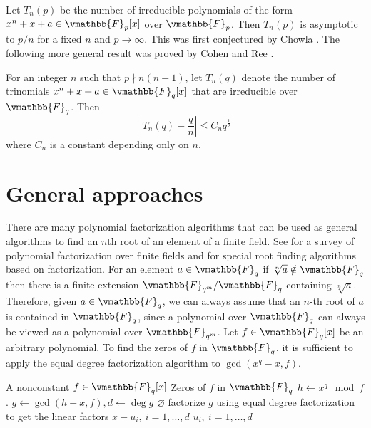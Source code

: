 Let $T_n(p)$ be the number of irreducible polynomials of the form $x^n + x + a \in \vmathbb{F}_p[x]$ 
over $\vmathbb{F}_p$. Then $T_n(p)$ is asymptotic to $p / n$ for a fixed $n$ and $p \rightarrow 
\infty$. This was first conjectured by Chowla \cite{Chowla1966}. The following more general result 
was proved by Cohen \cite{Cohen1970} and Ree \cite{Ree1971}. 
\begin{theorem}
For an integer $n$ such that $p \nmid n(n - 1)$, let $T_n(q)$ denote the number of trinomials $x^n + 
x + a \in \vmathbb{F}_q[x]$ that are irreducible over $\vmathbb{F}_q$. Then
$$
\left| T_n(q) - \frac{q}{n} \right| \le C_nq^{\frac{1}{2}}
$$
where $C_n$ is a constant depending only on $n$.
\end{theorem}









\section{General approaches}

There are many polynomial factorization algorithms that can be used as general algorithms to find an 
$n$th root of an element of a finite field. See \cite{vonzurGathen2001} for a survey of polynomial 
factorization over finite fields and \cite{Lidl-Niederreiter1994} for special root finding 
algorithms based on factorization. For an element $a \in \vmathbb{F}_q$ if $\sqrt[n]{a} \notin 
\vmathbb{F}_q$ then there is a finite extension $\vmathbb{F}_{q^m} / \vmathbb{F}_q$ containing 
$\sqrt[n]{a}$. Therefore, given $a \in \vmathbb{F}_q$, we can always assume that an $n$-th root of 
$a$ is contained in $\vmathbb{F}_q$, since a polynomial over $\vmathbb{F}_q$ can always be viewed as a 
polynomial over $\vmathbb{F}_{q^m}$. Let $f \in \vmathbb{F}_q[x]$ be an arbitrary polynomial. To find 
the zeros of $f$ in $\vmathbb{F}_q$, it is sufficient to apply the equal degree factorization 
algorithm to $\gcd(x^q - x, f)$.

\begin{algorithm}
\label{algorithm:groot1}
\begin{algorithmic}[1]
\REQUIRE A nonconstant $f \in \vmathbb{F}_q[x]$
\ENSURE  Zeros of $f$ in $\vmathbb{F}_q$
\STATE $h \leftarrow x^q \mod f$.
\label{step:genroot-pow}
\STATE $g \leftarrow \gcd(h - x, f), d \leftarrow \deg{g}$
\label{step:genroot-gcd}
	\RETURN $\varnothing$
\ENDIF
\STATE factorize $g$ using equal degree factorization to get the linear factors $x - u_i, \: i = 1, 
\dots, d$
\RETURN $u_i, \: i = 1, \dots, d$
\end{algorithmic}
\end{algorithm}

